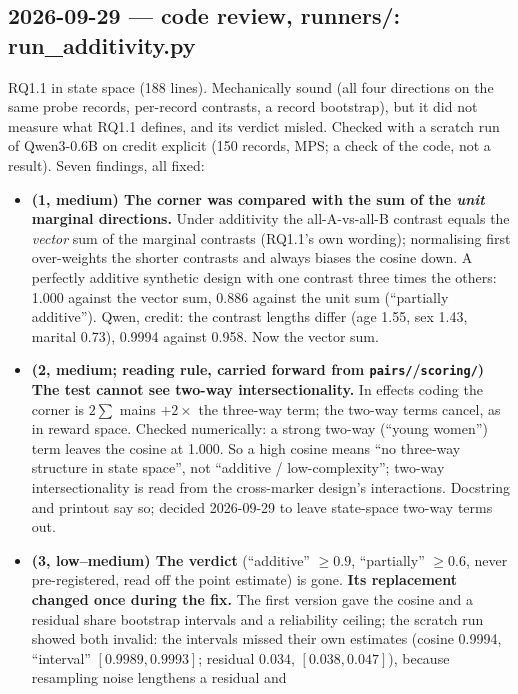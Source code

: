 \documentclass{article}
\begin{document}
\subsection*{2026-09-29 --- code review, runners/: run\_additivity.py}
RQ1.1 in state space (188 lines). Mechanically sound (all four directions on the same probe records, per-record
contrasts, a record bootstrap), but it did not measure what RQ1.1 defines, and its verdict misled. Checked with a
scratch run of Qwen3-0.6B on credit explicit (150 records, MPS; a check of the code, not a result). Seven findings,
all fixed:
\begin{itemize}
  \item \textbf{(1, medium) The corner was compared with the sum of the \emph{unit} marginal directions.} Under
        additivity the all-A-vs-all-B contrast equals the \emph{vector} sum of the marginal contrasts (RQ1.1's own
        wording); normalising first over-weights the shorter contrasts and always biases the cosine down. A perfectly
        additive synthetic design with one contrast three times the others: 1.000 against the vector sum, 0.886
        against the unit sum (``partially additive''). Qwen, credit: the contrast lengths differ (age 1.55, sex
        1.43, marital 0.73), 0.9994 against 0.958. Now the vector sum.
  \item \textbf{(2, medium; reading rule, carried forward from \texttt{pairs/}/\texttt{scoring/}) The test cannot see
        two-way intersectionality.} In effects coding the corner is $2\sum$ mains $+ 2\times$ the three-way term; the
        two-way terms cancel, as in reward space. Checked numerically: a strong two-way (``young women'') term leaves
        the cosine at 1.000. So a high cosine means ``no three-way structure in state space'', not ``additive /
        low-complexity''; two-way intersectionality is read from the cross-marker design's interactions. Docstring
        and printout say so; decided 2026-09-29 to leave state-space two-way terms out.
  \item \textbf{(3, low--medium) The verdict} (``additive'' $\geq 0.9$, ``partially'' $\geq 0.6$, never
        pre-registered, read off the point estimate) is gone. \textbf{Its replacement changed once during the fix.}
        The first version gave the cosine and a residual share bootstrap intervals and a reliability ceiling; the
        scratch run showed both invalid: the intervals missed their own estimates (cosine 0.9994, ``interval''
        $[0.9989, 0.9993]$; residual 0.034, $[0.038, 0.047]$), because resampling noise lengthens a residual and

\end{itemize}
\end{document}
